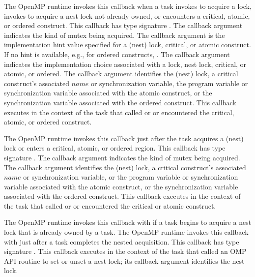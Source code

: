 \documentclass{article}
\newcommand{\descheader}[1]{{\needspace{3\baselineskip}\vspace{1em}\noindent \fbox{#1}}}
\begin{document}
\descheader{Lock, Nest Lock, Critical Section, Atomic, and Ordered}

\begin{description}

\item {} 

\sloppy
   The OpenMP runtime invokes this callback when a task invokes
     to acquire a lock, invokes  to acquire a nest lock not already owned,
   or encounters a critical, atomic, or ordered construct. 
   This callback has type signature . 
    The callback argument  indicates the kind of mutex being acquired.
    The callback argument  is the implementation hint value specified for a (nest) lock, critical, or atomic construct.
    If no hint is available, e.g., for ordered constructs, .
   The callback argument  indicates the implementation choice associated with a lock, nest lock, critical, or atomic, or ordered.
   The callback argument  identifies the (nest) lock, a critical construct's associated $name$ or synchronization variable, the program variable or synchronization variable associated with the atomic construct, or the synchronization variable associated with the ordered construct.
   This callback executes in the context of the task that called  or  or encountered the
   critical, atomic, or ordered construct.

\item {} 

   The OpenMP runtime invokes this callback just after the task acquires a (nest) lock or enters a critical, atomic, or ordered region.
   This callback has type signature . 
   The callback argument  indicates the kind of mutex being acquired.
   The callback argument  identifies the (nest) lock, a critical construct's associated $name$ or synchronization variable, or the program variable or synchronization variable associated with the atomic construct, or the synchronization variable associated with the ordered construct.
   This callback executes in the context of the task that called  or  or encountered the
   critical or atomic construct.

\item {}

\sloppy
   The OpenMP runtime invokes this callback with  if a task begins to acquire a nest lock that is already owned by a task.
   The OpenMP runtime invokes this callback with   just after a task completes the nested acquisition.
   This callback  has type signature . 
   This callback executes in the context of the task that called an OMP API routine to set or unset a nest lock; its
   callback argument  identifies the nest lock.

\end{description}
\end{document}
